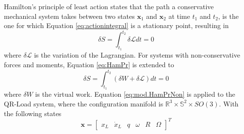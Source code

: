 Hamilton's principle of least action states that the path a conservative mechanical system takes between two states $ \mathbf{x}_1 $ and $ \mathbf{x}_2 $ at time $ t_1 $ and $ t_2 $, is the one for which Equation \ref{eq:actionintegral} is a stationary point, resulting in
\begin{equation}\label{eq:HamPr}
\delta S=\int_{t_1}^{t_2}\delta\mathcal{L}dt=0
\end{equation}
where $ \delta\mathcal{L} $ is the variation of the Lagrangian. For systems with non-conservative forces and moments, Equation \ref{eq:HamPr} is extended to
\begin{equation}\label{eq:mod.HamPrNon}
\delta S=\int_{t_1}^{t_2}(\delta W+\delta\mathcal{L})dt=0
\end{equation}
where $ \delta W $ is the virtual work. Equation \ref{eq:mod.HamPrNon} is applied to the QR-Load system, where the configuration manifold is $ \mathbb{R}^3\times \mathbb{S}^2\times SO(3) $. With the following states
\begin{equation}
\textbf{x}= \begin{bmatrix}x_L& \dot{x}_L& q& \omega&R&\Omega
\end{bmatrix}^T
\end{equation}



